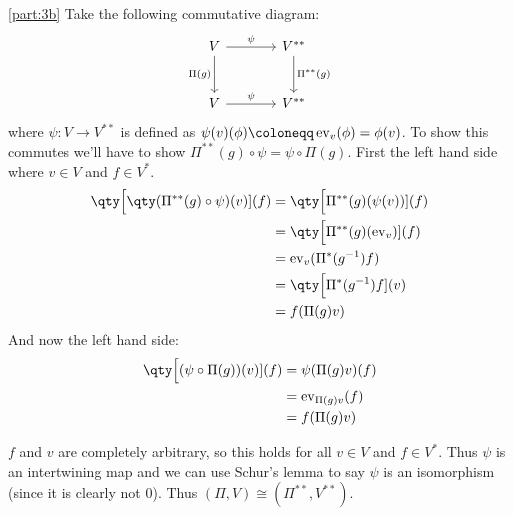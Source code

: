 \documentclass[
	pages,
	boxes,
	color=WildStrawberry
]{homework}
\begin{document}
\begin{solution}
	\ref{part:3b}
	Take the following commutative diagram:
	\begin{equation*}
		\begin{tikzcd}[row sep=large, column sep=large]
			V \arrow{r}{\psi} \arrow[swap]{d}{\Pi(g)} & V^{**} \arrow{d}{\Pi^{**}(g)} \\
			V \arrow{r}{\psi} & V^{**}
		\end{tikzcd}
	\end{equation*}
	where $\psi: V\to V^{**}$ is defined as $\psi(v)(\phi)\defeq \operatorname{ev}_v(\phi) = \phi(v)$. To show this commutes we'll have to show $\Pi^{**}(g)\circ \psi = \psi \circ \Pi(g)$. First the left hand side where $v\in V$ and $f\in V^*$.
	\begin{align*}
		\qty\Big[\qty(\Pi^{**}(g)\circ \psi)(v)](f) & = \qty\Big[\Pi^{**}(g)(\psi(v))](f)             \\
		                                            & = \qty\Big[\Pi^{**}(g)(\operatorname{ev}_v)](f) \\
		                                            & = \operatorname{ev}_v(\Pi^{*}(g^{-1})f)         \\
		                                            & = \qty\Big[\Pi^{*}(g^{-1})f](v)                 \\
		                                            & = f(\Pi(g)v)
	\end{align*}
	And now the left hand side:
	\begin{align*}
		\qty\Big[(\psi\circ \Pi(g))(v)](f) & = \psi(\Pi(g)v)(f)               \\
		                                   & = \operatorname{ev}_{\Pi(g)v}(f) \\
		                                   & = f(\Pi(g)v)
	\end{align*}

	$f$ and $v$ are completely arbitrary, so this holds for all $v\in V$ and $f\in V^{*}$. Thus $\psi$ is an intertwining map and we can use Schur's lemma to say $\psi$ is an isomorphism (since it is clearly not 0). Thus $(\Pi, V)\cong (\Pi^{**}, V^{**})$.
\end{solution}
\end{document}

